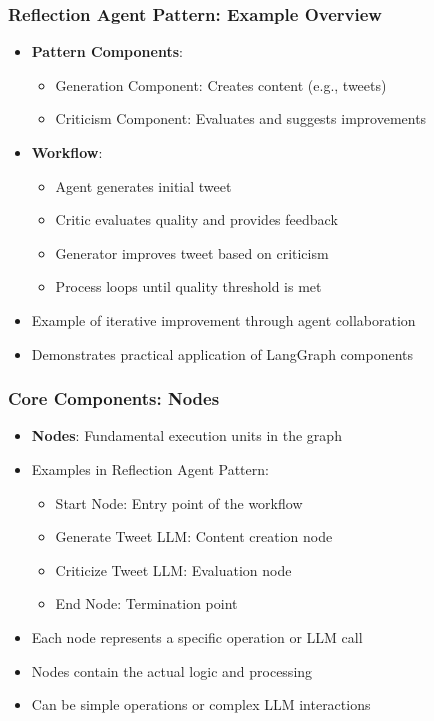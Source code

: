 \begin{frame}[fragile]\frametitle{Reflection Agent Pattern: Example Overview}
      \begin{itemize}
        \item \textbf{Pattern Components}:
        \begin{itemize}
            \item Generation Component: Creates content (e.g., tweets)
            \item Criticism Component: Evaluates and suggests improvements
        \end{itemize}
        \item \textbf{Workflow}:
        \begin{itemize}
            \item Agent generates initial tweet
            \item Critic evaluates quality and provides feedback
            \item Generator improves tweet based on criticism
            \item Process loops until quality threshold is met
        \end{itemize}
        \item Example of iterative improvement through agent collaboration
        \item Demonstrates practical application of LangGraph components
      \end{itemize}
\end{frame}

\begin{frame}[fragile]\frametitle{Core Components: Nodes}
      \begin{itemize}
        \item \textbf{Nodes}: Fundamental execution units in the graph
        \item Examples in Reflection Agent Pattern:
        \begin{itemize}
            \item Start Node: Entry point of the workflow
            \item Generate Tweet LLM: Content creation node
            \item Criticize Tweet LLM: Evaluation node
            \item End Node: Termination point
        \end{itemize}
        \item Each node represents a specific operation or LLM call
        \item Nodes contain the actual logic and processing
        \item Can be simple operations or complex LLM interactions
      \end{itemize}
\end{frame}

